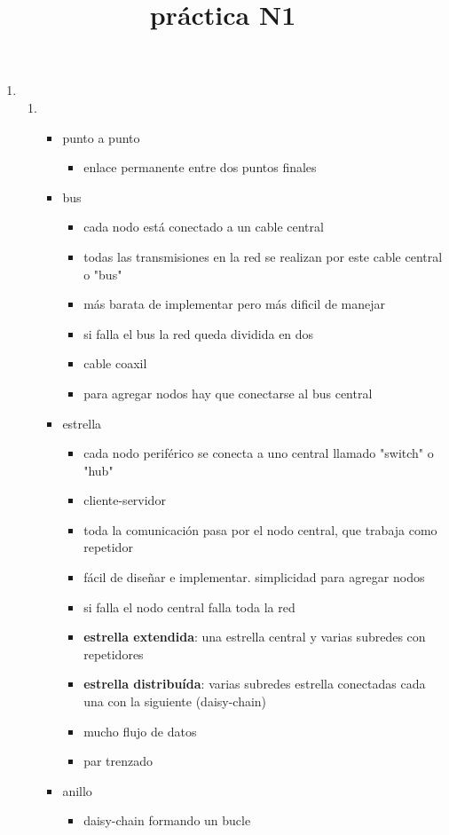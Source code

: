 \documentclass[11pt]{article}
\date{}
\title{práctica N1}
\begin{document}
\maketitle
\begin{enumerate}
\item \begin{enumerate}
\item \begin{itemize}
\item punto a punto
\begin{itemize}
\item enlace permanente entre dos puntos finales
\end{itemize}
\item bus
\begin{itemize}
\item cada nodo está conectado a un cable central
\item todas las transmisiones en la red se realizan por este cable central o "bus"
\item más barata de implementar pero más dificil de manejar
\item si falla el bus la red queda dividida en dos
\item cable coaxil
\item para agregar nodos hay que conectarse al bus central
\end{itemize}
\item estrella
\begin{itemize}
\item cada nodo periférico se conecta a uno central llamado "switch" o "hub"
\item cliente-servidor
\item toda la comunicación pasa por el nodo central, que trabaja como repetidor
\item fácil de diseñar e implementar. simplicidad para agregar nodos
\item si falla el nodo central falla toda la red
\item \textbf{estrella extendida}: una estrella central y varias subredes con repetidores
\item \textbf{estrella distribuída}: varias subredes estrella conectadas cada una con la siguiente (daisy-chain)
\item mucho flujo de datos
\item par trenzado
\end{itemize}
\item anillo
\begin{itemize}
\item daisy-chain formando un bucle

\end{itemize}
\end{itemize}
\end{enumerate}
\end{enumerate}
\end{document}
